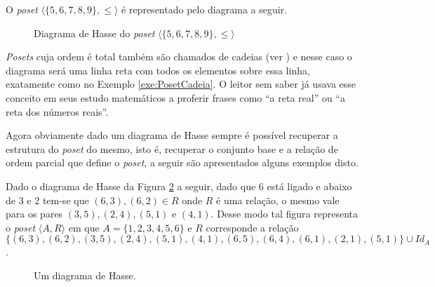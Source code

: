 \begin{example}\label{exe:PosetCadeia}
	O \textit{poset} $\langle \{5, 6, 7, 8, 9\}, \leq \rangle$ é representado pelo diagrama a seguir.
	
	\begin{figure}[h]
		\centering
		\caption{Diagrama de Hasse do \textit{poset} $\langle \{5, 6, 7, 8, 9\}, \leq \rangle$}
		\label{fig:DiagramaHasse4}
	\end{figure}
\end{example}

\begin{note}
	\textit{Posets} cuja ordem é total também são chamados de cadeias (ver \cite{abe1991-TC, morgado1962poset}) e nesse caso o diagrama será uma linha reta com todos os elementos sobre essa linha, exatamente como no Exemplo \ref{exe:PosetCadeia}. O leitor sem saber já usava esse conceito em seus estudo matemáticos a proferir frases como ``a reta real'' ou ``a reta dos números reais''.
\end{note}

Agora obviamente dado um diagrama de Hasse sempre é possível recuperar a estrutura do \textit{poset} do mesmo, isto é, recuperar o conjunto base e a relação de ordem parcial que define o \textit{poset}, a seguir são apresentados alguns exemplos disto.

\begin{example}
	Dado o diagrama de Hasse da Figura \ref{fig:DiagramaHasse5} a seguir,  dado que $6$ está ligado e abaixo de $3$ e $2$ tem-se que $(6,3), (6, 2) \in R$ onde $R$ é uma relação, o mesmo vale para os pares $(3, 5), (2, 4), (5, 1)$  e $(4, 1)$. Desse modo tal figura representa o \textit{poset} $\langle A, R \rangle$ em que $A = \{1, 2, 3, 4, 5, 6\}$ e $R$ corresponde a relação $\{(6,3), (6, 2), (3, 5), (2, 4), (5, 1), (4, 1), (6, 5), (6, 4), (6, 1), (2, 1), (5, 1)\} \cup Id_A$.
	
		\begin{figure}[h]
		\centering
		\caption{Um diagrama de Hasse.}
		\label{fig:DiagramaHasse5}
	\end{figure}
\end{example}

